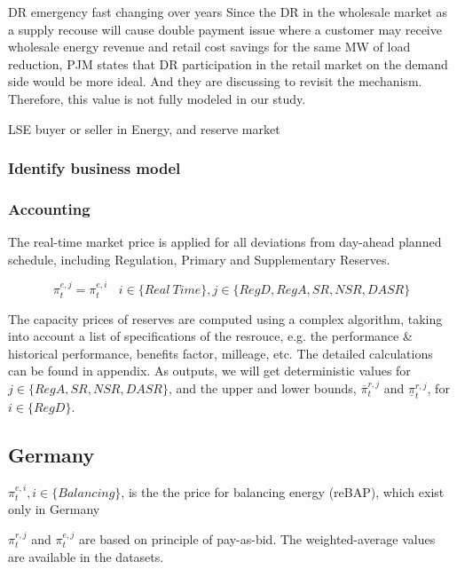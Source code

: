 DR emergency fast changing over years \cite{Brown2015}
Since the DR in the wholesale market as a supply recouse will cause double payment issue where a customer may receive wholesale energy revenue and retail cost savings for the same MW of load reduction, PJM states that DR participation in the retail market on the demand side would be more ideal. And they are discussing to revisit the mechanism. Therefore, this value is not fully modeled in our study.

LSE
buyer or seller in Energy, and reserve market

\subsubsection{Identify business model}

\subsubsection{Accounting}





The real-time market price is applied for all deviations from day-ahead planned schedule, including Regulation, Primary and Supplementary Reserves.

\begin{equation*}
\pi_t^{e,j} = \pi_t^{e,i} ~~~~ i \in \{Real~Time\}, j \in \{RegD, RegA, SR, NSR, DASR\}
\end{equation*}

The capacity prices of reserves are computed using a complex algorithm, taking into account a list of specifications of the resrouce, e.g. the performance \& historical performance, benefits factor, milleage, etc. The detailed calculations can be found in appendix. As outputs, we will get deterministic values for $j \in \{RegA, SR, NSR, DASR\}$, and the upper and lower bounds, $\overline{\pi}_t^{r,j}$ and $\underline{\pi}_t^{r,j}$, for $i \in \{RegD\}$.


\subsection{Germany}
$\pi_t^{e,i}, i \in \{Balancing\}$, is the the price for balancing energy (reBAP), which exist only in Germany

$\pi_t^{r,j}$ and $\pi_t^{e,j}$ are based on principle of pay-as-bid. The weighted-average values are available in the datasets.

